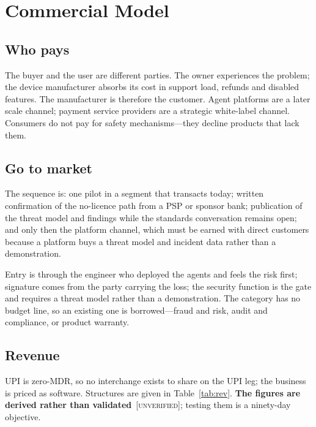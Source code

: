 \documentclass[journal,onecolumn,11pt]{IEEEtran}
\newcommand{\unver}{{\footnotesize\textsc{\textcolor{orange!80!black}{[unverified]}}}}
\begin{document}
\section{Commercial Model}\label{sec:biz}

\subsection{Who pays}
The buyer and the user are different parties. The owner experiences the problem; the
device manufacturer absorbs its cost in support load, refunds and disabled features.
The manufacturer is therefore the customer. Agent platforms are a later scale channel;
payment service providers are a strategic white-label channel. Consumers do not pay
for safety mechanisms---they decline products that lack them.

\subsection{Go to market}
The sequence is: one pilot in a segment that transacts today; written confirmation of
the no-licence path from a PSP or sponsor bank; publication of the threat model and
findings while the standards conversation remains open; and only then the platform
channel, which must be earned with direct customers because a platform buys a threat
model and incident data rather than a demonstration.

Entry is through the engineer who deployed the agents and feels the risk first;
signature comes from the party carrying the loss; the security function is the gate
and requires a threat model rather than a demonstration. The category has no budget
line, so an existing one is borrowed---fraud and risk, audit and compliance, or
product warranty.

\subsection{Revenue}
UPI is zero-MDR, so no interchange exists to share on the UPI leg; the business is
priced as software. Structures are given in Table~\ref{tab:rev}. \textbf{The figures
are derived rather than validated}~\unver; testing them is a ninety-day objective.
\end{document}
